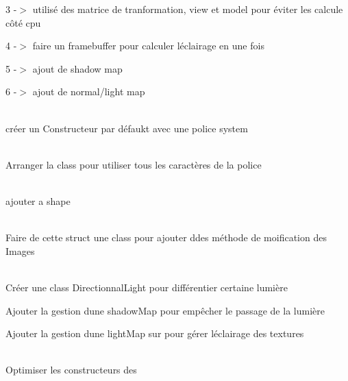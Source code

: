 \begin{DoxyRefList}
3 -\/\texorpdfstring{$>$}{>} utilisé des matrice de tranformation, view et model pour éviter les calcule côté cpu 



4 -\/\texorpdfstring{$>$}{>} faire un framebuffer pour calculer l\textquotesingle{}éclairage en une fois 



5 -\/\texorpdfstring{$>$}{>} ajout de shadow map 



6 -\/\texorpdfstring{$>$}{>} ajout de normal/light map  
\item[Class \doxylink{classFont}{Font} ]\hfill \\
\label{todo__todo000006}%
%
créer un Constructeur par défaukt avec une police system  
\item[Member \doxylink{classFont_a41a7dca42ac0df85a27163dc9ace9de3}{Font\+::Font} (int glyph\+Size, const char \texorpdfstring{$\ast$}{*}ttf\+Path)]\hfill \\
\label{todo__todo000007}%
%
Arranger la class pour utiliser tous les caractères de la police  
\item[Class \doxylink{classGeometric}{Geometric} ]\hfill \\
\label{todo__todo000008}%
%
ajouter a shape  
\item[Struct \doxylink{structImage}{Image} ]\hfill \\
\label{todo__todo000013}%
%
Faire de cette struct une class pour ajouter ddes méthode de moification des Images  
\item[Class \doxylink{classLight}{Light} ]\hfill \\
\label{todo__todo000009}%
%
Créer une class Directionnal\+Light pour différentier certaine lumière 



Ajouter la gestion d\textquotesingle{}une shadow\+Map pour empêcher le passage de la lumière 



Ajouter la gestion d\textquotesingle{}une light\+Map sur  pour gérer l\textquotesingle{}éclairage des textures  
\item[Class \doxylink{classShape}{Shape} ]\hfill \\
\label{todo__todo000012}%
%
Optimiser les constructeurs des  




\end{DoxyRefList}
